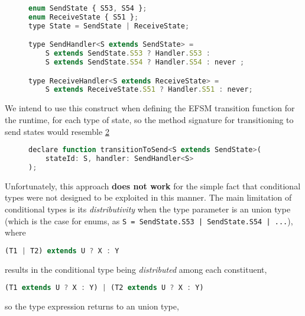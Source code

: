 \begin{figure}[!h]
\begin{lstlisting}[language=javascript,tabsize=2]
enum SendState { S53, S54 };
enum ReceiveState { S51 };
type State = SendState | ReceiveState;

type SendHandler<S extends SendState> = 
	S extends SendState.S53 ? Handler.S53 :
	S extends SendState.S54 ? Handler.S54 : never ;

type ReceiveHandler<S extends ReceiveState> = 
	S extends ReceiveState.S51 ? Handler.S51 : never;
\end{lstlisting}
\label{lst:conditionaltypes}
\end{figure}

We intend to use this construct when defining the EFSM transition
function for the runtime, for each type of state,
so the method signature for transitioning to send states
would resemble \cref{lst:conditionaltransitionfunction}

\begin{figure}[!h]
\begin{lstlisting}[language=javascript,numbers=none]
declare function transitionToSend<S extends SendState>(
	stateId: S, handler: SendHandler<S>
);
\end{lstlisting}
\label{lst:conditionaltransitionfunction}
\end{figure}

Unfortunately, this approach \textbf{does not work}
for the simple fact that
conditional types were not designed to be exploited in this manner.
The main limitation of conditional types is its 
\textit{distributivity} when the type parameter is an
union type (which is the case for enums, as
\texttt{S = SendState.S53 | SendState.S54 | ...}), where

\begin{lstlisting}[language=javascript,numbers=none]
(T1 | T2) extends U ? X : Y
\end{lstlisting}

results in the conditional type being \textit{distributed}
among each constituent,

\begin{lstlisting}[language=javascript,numbers=none]
(T1 extends U ? X : Y) | (T2 extends U ? X : Y)
\end{lstlisting}

so the type expression returns to an union type,

